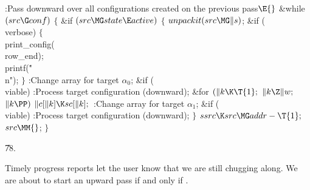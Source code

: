 \B{}:Pass downward over all configurations created on
the previous pass\X${}\E{}$\6
\&{while} ${}(\\{src}\G\\{conf}){}$\5
${}\{{}$\1\6
\&{if} ${}(\\{src}\MG\\{state}\E\\{active}){}$\5
${}\{{}$\1\6
${}\\{unpackit}(\\{src}\MG\|s){}$;\6
\&{if} (\\{verbose})\5
${}\{{}$\1\6
\\{print\_config}(\\{row\_end});\5
\\{printf}(\.{"\\n"});\6
\4${}\}{}$\2\6
:Change array  for target $\alpha_0$\X;\6
\&{if} (\\{viable})\1\5
:Process target configuration  (downward)\X;\2\6
\&{for} ${}(\|k\K\T{1};{}$ ${}\|k\Z\|w;{}$ ${}\|k\PP){}$\1\5
${}\|c[\|k]\K\\{sc}[\|k];{}$\2\6
:Change array  for target $\alpha_1$\X;\6
\&{if} (\\{viable})\1\5
:Process target configuration  (downward)\X;\2\6
\4${}\}{}$\2\6
${}\\{ssrc}\K\\{src}\MG\\{addr}-\T{1};{}$\6
${}\\{src}\MM{}$;\6
\4${}\}{}$\2\par
\U78.\fi

Timely progress reports let the user know that we are
still chugging along.
We are about to start an upward pass if and only if .

